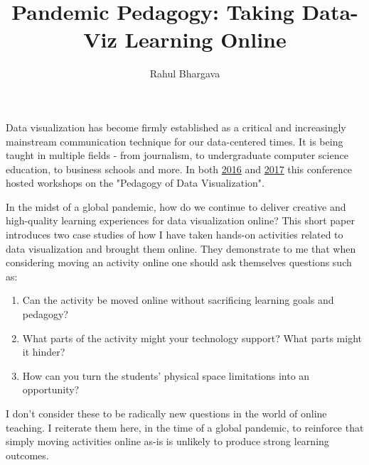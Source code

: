 \documentclass[journal]{vgtc}                %
\title{Pandemic Pedagogy: Taking Data-Viz Learning Online}
\author{Rahul Bhargava}
\begin{document}


\maketitle

Data visualization has become firmly established as a critical and increasingly mainstream communication technique for our data-centered times. It is being taught in multiple fields - from journalism\cite{gray_data_2012}, to undergraduate computer science education\cite{syeda_design_2020}, to business schools\cite{wolfe_teaching_2015} and more. In both \href{https://vgl.cs.usfca.edu/pdvw/2016/}{2016} and \href{https://vgl.cs.usfca.edu/pdvw/2017/}{2017} this conference hosted workshops on the "Pedagogy of Data Visualization".

In the midst of a global pandemic, how do we continue to deliver creative and high-quality learning experiences for data visualization online? This short paper introduces two case studies of how I have taken hands-on activities related to data visualization and brought them online. They demonstrate to me that when considering moving an activity online one should ask themselves questions such as:
\begin{enumerate}
  \itemsep0em 
  \item Can the activity be moved online without sacrificing learning goals and pedagogy?
  \item What parts of the activity might your technology support? What parts might it hinder?
  \item How can you turn the students’ physical space limitations into an opportunity?
\end{enumerate}
I don’t consider these to be radically new questions in the world of online  teaching. I reiterate them here, in the time of a global pandemic, to reinforce that simply moving activities online as-is is unlikely to produce strong learning outcomes.
\end{document}
